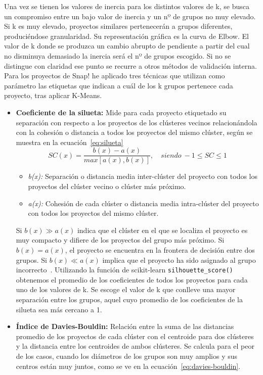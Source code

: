 \documentclass[a4paper, 12pt]{book}
\begin{document}
Una vez se tienen los valores de inercia para los distintos valores de k, se busca un compromiso entre un bajo valor de inercia y un nº de grupos no muy elevado. Si k es muy elevado, proyectos similares pertenecerán a grupos diferentes, produciéndose granularidad. Su representación gráfica es la curva de Elbow. El valor de k donde se produzca un cambio abrupto de pendiente a partir del cual no disminuya demasiado la inercia será el nº de grupos escogido. Si no se distingue con claridad ese punto se recurre a otros métodos de validación interna. Para los proyectos de Snap! he aplicado tres técnicas que utilizan como parámetro las etiquetas que indican a cuál de los k grupos pertenece cada proyecto, tras aplicar K-Means. 

\begin{itemize}
    \item \textbf{Coeficiente de la silueta:} Mide para cada proyecto etiquetado su separación con respecto a los proyectos de los clústeres vecinos relacionándola con la cohesión o distancia a todos los proyectos del mismo clúster, según se muestra en la ecuación~\eqref{eq:silueta}
    \begin{equation}
        SC(x)=\frac {b(x)-a(x)}{max[a(x),b(x)]},\quad\mathit{siendo}\ -1\leq SC \leq1
        \label{eq:silueta}
    \end{equation}   
    \begin{itemize}
        \item \emph{b(x):} Separación o distancia media inter-clúster del proyecto con todos los proyectos del clúster vecino o clúster más próximo.
        \item \emph{a(x):} Cohesión de cada clúster o distancia media intra-clúster del proyecto con todos los proyectos del mismo clúster.
    \end{itemize}
    Si $b(x)\gg a(x)$ indica que el clúster en el que se localiza el proyecto es muy compacto y difiere de los proyectos del grupo más próximo. Si $b(x)= a(x)$, el proyecto se encuentra en la frontera de decisión entre dos grupos. Si $b(x)\ll a(x)$ implica que el proyecto ha sido asignado al grupo incorrecto~\cite{rousseeuv_87}. Utilizando la función de scikit-learn \texttt{silhouette\_score()} obtenemos el promedio de los coeficientes de todos los proyectos para cada uno de los valores de k. Se escoge el valor de k que conlleve una mayor separación entre los grupos, aquel cuyo promedio de los coeficientes de la silueta sea más cercano a 1. 
    \item \textbf{Índice de Davies-Bouldin:} Relación entre la suma de las distancias promedio de los proyectos de cada clúster con el centroide para dos clústeres y la distancia entre los centroides de ambos clústeres. Se calcula para el peor de los casos, cuando los diámetros de los grupos son muy amplios y sus centros están muy juntos, como se ve en la ecuación~\eqref{eq:davies-bouldin}. 

\end{itemize}
\end{document}
